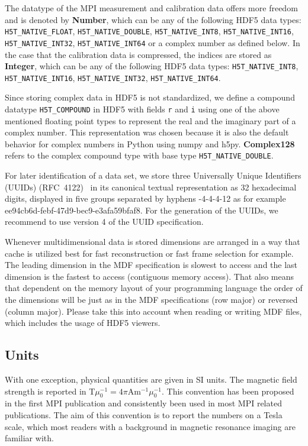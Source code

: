 \documentclass[landscape,a4paper]{article} %
\newcommand{\inl}[1]{\lstinline[columns=fixed]{#1}}
\newcommand{\inltab}[1]{{\ttfamily\bfseries\color{blue}#1}}
\newcommand{\inlvar}[1]{{\ttfamily#1}}
\begin{document}
\begin{multicols}{2}
The datatype of the MPI measurement and calibration data offers more freedom and is denoted by \inltab{Number}, which can be any of the following HDF5 data types: \inl{H5T_NATIVE_FLOAT}, \mbox{\inl{H5T_NATIVE_DOUBLE},} \mbox{\inl{H5T_NATIVE_INT8},} \inl{H5T_NATIVE_INT16}, \inl{H5T_NATIVE_INT32}, \inl{H5T_NATIVE_INT64} or a complex number as defined below. In the case that the calibration data is compressed, the indices are stored as \inltab{Integer}, which can be any of the following HDF5 data types: \mbox{\inl{H5T_NATIVE_INT8},} \inl{H5T_NATIVE_INT16}, \inl{H5T_NATIVE_INT32}, \inl{H5T_NATIVE_INT64}.

Since storing complex data in HDF5 is not standardized, we define a compound datatype \inl{H5T_COMPOUND} in HDF5 with fields \inl{r} and \inl{i} using one of the above mentioned floating point types to represent the real and the imaginary part of a complex number. This representation was chosen because it is also the default behavior for complex numbers in Python using numpy and h5py. \inltab{Complex128} refers to the complex compound type with base type \inl{H5T_NATIVE_DOUBLE}.

For later identification of a data set, we store three Universally Unique Identifiers (UUIDs) (RFC~4122)~\cite{leach2005universally} in its canonical textual representation as 32 hexadecimal digits, displayed in five groups separated by hyphens \inlvar{8-4-4-4-12} as for example \inlvar{ee94cb6d-febf-47d9-bec9-e3afa59bfaf8}. For the generation of the UUIDs, we recommend to use version 4 of the UUID specification.

Whenever multidimensional data is stored dimensions are arranged in a way that cache is utilized best for fast reconstruction or fast frame selection for example. The leading dimension in the MDF specification is slowest to access and the last dimension is the fastest to access (contiguous memory access). That also means that dependent on the memory layout of your programming language the order of the dimensions will be just as in the MDF specifications (row major) or reversed (column major). Please take this into account when reading or writing MDF files, which includes the usage of HDF5 viewers.

\subsection{Units}

With one exception, physical quantities are given in SI units. The magnetic field strength is reported in T$\mu_0^{-1} = 4 \pi$Am$^{-1}\mu_0^{-1}$. This convention has been proposed in the first MPI publication \cite{Gleich2005} and consistently been used in most MPI related publications. The aim of this convention is to report the numbers on a Tesla scale, which most readers with a background in magnetic resonance imaging are familiar with.


\end{multicols}
\end{document}

